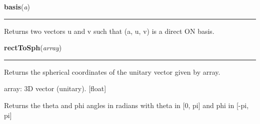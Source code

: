     \vspace{0.5ex}

\hspace{.8\funcindent}\begin{boxedminipage}{\funcwidth}

    \raggedright \textbf{basis}(\textit{a})

    \vspace{-1.5ex}

    \rule{\textwidth}{0.5\fboxrule}
\setlength{\parskip}{2ex}
    Returns two vectors u and v such that (a, u, v) is a direct ON basis.

\setlength{\parskip}{1ex}
    \end{boxedminipage}

    \label{theia:helpers:geometry:rectToSph}

    \vspace{0.5ex}

\hspace{.8\funcindent}\begin{boxedminipage}{\funcwidth}

    \raggedright \textbf{rectToSph}(\textit{array})

    \vspace{-1.5ex}

    \rule{\textwidth}{0.5\fboxrule}
\setlength{\parskip}{2ex}
    Returns the spherical coordinates of the unitary vector given by array.

    array: 3D vector (unitary). [float]

    Returns the theta and phi angles in radians with theta in [0, pi] and 
    phi in [-pi, pi]

\setlength{\parskip}{1ex}
    \end{boxedminipage}

